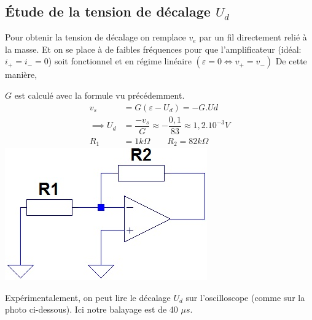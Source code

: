 \documentclass[11pt,a4paper]{article}
\begin{document}
\subsection{Étude de la tension de décalage $U_{d}$}
Pour obtenir la tension de décalage on remplace $v_{e}$ par un fil directement relié à la masse. Et on se place à de faibles fréquences pour que l'amplificateur (idéal: $i_+ = i_-=0$) soit fonctionnel et en régime linéaire $(\varepsilon=0 \Leftrightarrow v_+ = v_-)$
De cette manière,
\begin{multicols}{2}
$G$ est calculé avec la formule vu précédemment.
\begin{align*}
v_{s}&=G(\varepsilon-U_{d})=-G . U{d}\\
\implies U_{d}&=\dfrac{-v_{s}}{G}\approx -\dfrac{0,1}{83}\approx 1,2.10^{-3}V\\
R_{1}&=1k\Omega \qquad R_{2}=82k\Omega
\end{align*}
\includegraphics[width=0.7\linewidth]{"Montage Tension decalage"}
\label{fig:montage-tension-decalage}
\end{multicols}

Expérimentalement, on peut lire le décalage $U_d$ sur l'oscilloscope (comme sur la photo ci-dessous). Ici notre balayage est de 40 $\mu s$.\\
\end{document}
